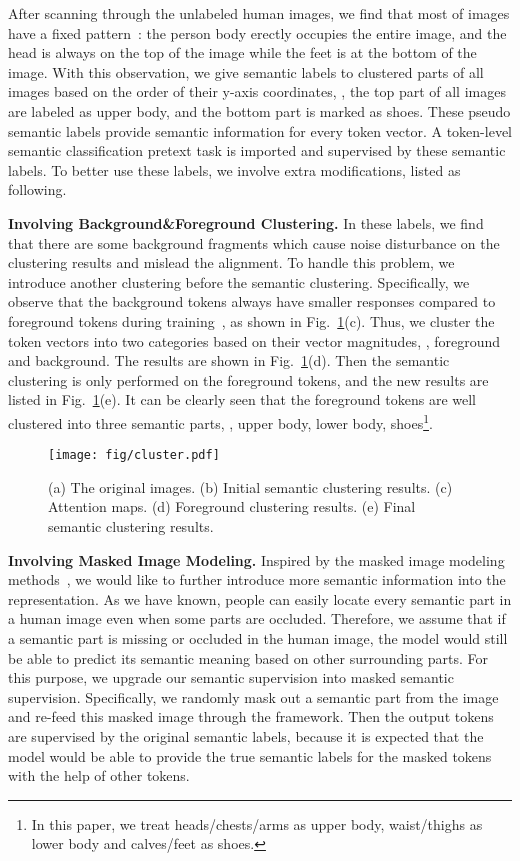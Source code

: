 \documentclass[10pt,twocolumn,letterpaper]{article}
\begin{document}
After scanning through the unlabeled human images, we find that most of images have a fixed pattern~\cite{pcb,isp}: the person body erectly occupies the entire image, and the head is always on the top of the image while the feet is at the bottom of the image. With this observation, we give semantic labels to clustered parts of all images based on the order of their y-axis coordinates, \ie, the top part of all images are labeled as upper body, and the bottom part is marked as shoes. These pseudo semantic labels provide semantic information for every token vector. 
A token-level semantic classification pretext task is imported and supervised by these semantic labels. To better use these labels, we involve extra modifications, listed as following.

\textbf{Involving Background\&Foreground Clustering.} In these labels, we find that there are some background fragments which cause noise disturbance on the clustering results and mislead the alignment. To handle this problem, we introduce  another clustering before the semantic clustering. Specifically, we observe that the background tokens always have smaller responses compared to foreground tokens during training~\cite{isp,mauthner2015encoding}, as shown in Fig.~\ref{fig:cluster}(c). Thus, we cluster the token vectors into two categories based on their vector magnitudes, \ie, foreground and background. The results are shown in Fig.~\ref{fig:cluster}(d). Then the semantic clustering is only performed on the foreground tokens, and the new results are listed in Fig.~\ref{fig:cluster}(e). It can be clearly seen that the foreground tokens are well clustered into three semantic parts, \ie, upper body, lower body, shoes\footnote{In this paper, we treat heads/chests/arms as upper body, waist/thighs as lower body and calves/feet as shoes.}.

\begin{figure}[!t]
\centering
\texttt{[image: fig/cluster.pdf]}
\vspace{-0.8cm}
\caption{(a) The original images. (b) Initial semantic clustering results. (c) Attention maps. (d) Foreground clustering results. (e) Final semantic clustering results.}
\label{fig:cluster}
\vspace{-0.3cm}
\end{figure}

\textbf{Involving Masked Image Modeling.} Inspired by the masked image modeling methods~\cite{mae,simmim}, we would like to further introduce more semantic information into the representation. As we have known, people can easily locate every semantic part in a human image even when some parts are occluded. Therefore, we assume that if a semantic part is missing or occluded in the human image, the model would still be able to predict its semantic meaning based on other surrounding parts. For this purpose, we upgrade our semantic supervision into masked semantic supervision. Specifically, we randomly mask out a semantic part from the image  and re-feed this masked image  through the framework. Then the output tokens are supervised by the original semantic labels, because it is expected that the model would be able to provide the true semantic labels for the masked tokens with the help of other tokens.
\end{document}
